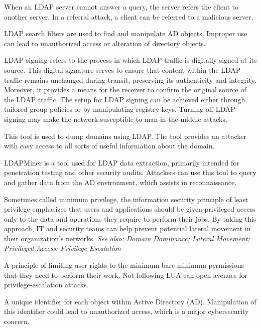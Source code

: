  When an LDAP server cannot answer a query, the server refers the client to another server. In a referral attack, a client can be referred to a malicious server.

 LDAP search filters are used to find and manipulate AD objects. Improper use can lead to unauthorized access or alteration of directory objects.

  LDAP signing refers to the process in which LDAP traffic is digitally signed at its source. This digital signature serves to ensure that content within the LDAP traffic remains unchanged during transit, preserving its authenticity and integrity. Moreover, it provides a means for the receiver to confirm the original source of the LDAP traffic. The setup for LDAP signing can be achieved either through tailored group policies or by manipulating registry keys. Turning off LDAP signing may make the network susceptible to man-in-the-middle attacks.

 This tool is used to dump domains using LDAP. The tool provides an attacker with easy access to all sorts of useful information about the domain.

 LDAPMiner is a tool used for LDAP data extraction, primarily intended for penetration testing and other security audits. Attackers can use this tool to query and gather data from the AD environment, which assists in reconnaissance.

 Sometimes called minimum privilege, the information security principle of least privilege emphasizes that users and applications should be given privileged access only to the data and operations they require to perform their jobs. By taking this approach, IT and security teams can help prevent potential lateral movement in their organization’s networks.
\textit{See also: Domain Dominance; Lateral Movement; Privileged Access; Privilege Escalation}

 A principle of limiting user rights to the minimum bare minimum permissions that they need to perform their work. Not following LUA can open avenues for privilege-escalation attacks.

 A unique identifier for each object within Active Directory (AD). Manipulation of this identifier could lead to unauthorized access, which is a major cybersecurity concern.

